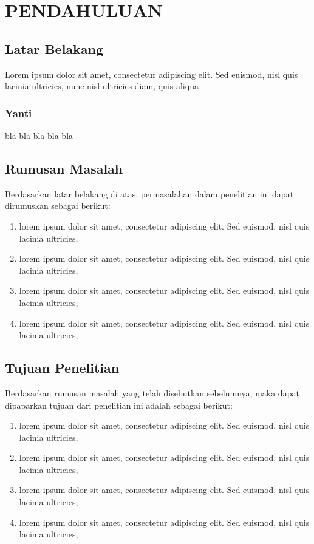 \fancyhf{} 
\fancyfoot[R]{\thepage}

\chapter{PENDAHULUAN}

\section{Latar Belakang}
Lorem ipsum dolor sit amet, consectetur adipiscing elit. Sed euismod, nisl quis lacinia ultricies, nunc nisl ultricies diam, quis aliqua

\subsection{Yanti}
bla bla bla bla bla


\section{Rumusan Masalah}
Berdasarkan latar belakang di atas, permasalahan dalam penelitian ini dapat dirumuskan sebagai berikut:
\begin{enumerate}
	\item lorem ipsum dolor sit amet, consectetur adipiscing elit. Sed euismod, nisl quis lacinia ultricies,
	\item lorem ipsum dolor sit amet, consectetur adipiscing elit. Sed euismod, nisl quis lacinia ultricies,
	\item lorem ipsum dolor sit amet, consectetur adipiscing elit. Sed euismod, nisl quis lacinia ultricies,
	\item lorem ipsum dolor sit amet, consectetur adipiscing elit. Sed euismod, nisl quis lacinia ultricies,
\end{enumerate}

\section{Tujuan Penelitian}
Berdasarkan rumusan masalah yang telah disebutkan sebelumnya, maka dapat dipaparkan tujuan dari penelitian ini adalah sebagai berikut:
\begin{enumerate}
	\item lorem ipsum dolor sit amet, consectetur adipiscing elit. Sed euismod, nisl quis lacinia ultricies,
	\item lorem ipsum dolor sit amet, consectetur adipiscing elit. Sed euismod, nisl quis lacinia ultricies,
	\item lorem ipsum dolor sit amet, consectetur adipiscing elit. Sed euismod, nisl quis lacinia ultricies,
	\item lorem ipsum dolor sit amet, consectetur adipiscing elit. Sed euismod, nisl quis lacinia ultricies,
\end{enumerate}


